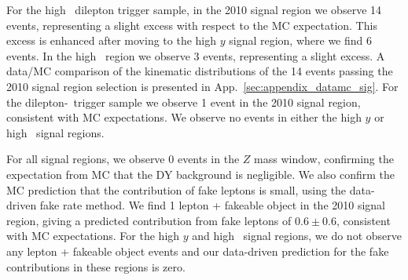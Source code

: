 For the high \pt\ dilepton trigger sample, in the 2010 signal region we observe 14 events, representing 
a slight excess with respect to the MC expectation. This excess is enhanced
after moving to the high $y$ signal region, where we find 6 events. 
In the high \Ht\ region we observe 3 events, representing a slight excess.
A data/MC comparison of the kinematic distributions of the 14 events passing
the 2010 signal region selection is presented in App.~\ref{sec:appendix_datamc_sig}.
For the dilepton-\Ht\ trigger sample we observe 1 event in the 2010 signal region,
consistent with MC expectations. We observe no events in either the high $y$ or
high \Ht\ signal regions.

For all signal regions, we observe 0 events in the $Z$ mass window,
confirming the expectation from MC that the 
DY background is negligible. We also confirm the MC prediction that
the contribution of fake leptons is small, using the data-driven fake
rate method. We find 1 lepton + fakeable object in the 2010 signal region,
giving a predicted contribution from fake leptons of $0.6 \pm 0.6$, consistent
with MC expectations. For the high $y$ and high \Ht\ signal regions, we do
not observe any lepton + fakeable object events and our data-driven prediction
for the fake contributions in these regions is zero.


